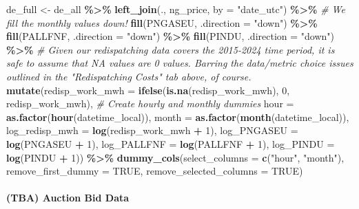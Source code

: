 \documentclass[
]{article}
\newenvironment{Shaded}{\begin{snugshade}}{\end{snugshade}}
\newcommand{\AttributeTok}[1]{\textcolor[rgb]{0.13,0.29,0.53}{#1}}
\newcommand{\CommentTok}[1]{\textcolor[rgb]{0.56,0.35,0.01}{\textit{#1}}}
\newcommand{\ConstantTok}[1]{\textcolor[rgb]{0.56,0.35,0.01}{#1}}
\newcommand{\DecValTok}[1]{\textcolor[rgb]{0.00,0.00,0.81}{#1}}
\newcommand{\FunctionTok}[1]{\textcolor[rgb]{0.13,0.29,0.53}{\textbf{#1}}}
\newcommand{\NormalTok}[1]{#1}
\newcommand{\OtherTok}[1]{\textcolor[rgb]{0.56,0.35,0.01}{#1}}
\newcommand{\SpecialCharTok}[1]{\textcolor[rgb]{0.81,0.36,0.00}{\textbf{#1}}}
\newcommand{\StringTok}[1]{\textcolor[rgb]{0.31,0.60,0.02}{#1}}
\begin{document}
\begin{Shaded}
\begin{Highlighting}[]
\NormalTok{de\_full }\OtherTok{\textless{}{-}}\NormalTok{ de\_all }\SpecialCharTok{\%\textgreater{}\%} 
  \FunctionTok{left\_join}\NormalTok{(., ng\_price, }\AttributeTok{by =} \StringTok{"date\_utc"}\NormalTok{) }\SpecialCharTok{\%\textgreater{}\%} 
  \CommentTok{\# We fill the monthly values down! }
  \FunctionTok{fill}\NormalTok{(PNGASEU, }\AttributeTok{.direction =} \StringTok{"down"}\NormalTok{) }\SpecialCharTok{\%\textgreater{}\%} 
  \FunctionTok{fill}\NormalTok{(PALLFNF, }\AttributeTok{.direction =} \StringTok{"down"}\NormalTok{) }\SpecialCharTok{\%\textgreater{}\%} 
  \FunctionTok{fill}\NormalTok{(PINDU, }\AttributeTok{.direction =} \StringTok{"down"}\NormalTok{) }\SpecialCharTok{\%\textgreater{}\%} 
  \CommentTok{\# Given our redispatching data covers the 2015{-}2024 time period, it is safe to assume that NA values are 0 values. Barring the data/metric choice issues outlined in the "Redispatching Costs" tab above, of course.}
  \FunctionTok{mutate}\NormalTok{(}\AttributeTok{redisp\_work\_mwh =} \FunctionTok{ifelse}\NormalTok{(}\FunctionTok{is.na}\NormalTok{(redisp\_work\_mwh), }\DecValTok{0}\NormalTok{, redisp\_work\_mwh),}
         \CommentTok{\# Create hourly and monthly dummies}
        \AttributeTok{hour =} \FunctionTok{as.factor}\NormalTok{(}\FunctionTok{hour}\NormalTok{(datetime\_local)),}
         \AttributeTok{month =} \FunctionTok{as.factor}\NormalTok{(}\FunctionTok{month}\NormalTok{(datetime\_local)),}
        \AttributeTok{log\_redisp\_mwh =} \FunctionTok{log}\NormalTok{(redisp\_work\_mwh }\SpecialCharTok{+} \DecValTok{1}\NormalTok{),}
        \AttributeTok{log\_PNGASEU =} \FunctionTok{log}\NormalTok{(PNGASEU }\SpecialCharTok{+} \DecValTok{1}\NormalTok{),}
        \AttributeTok{log\_PALLFNF =} \FunctionTok{log}\NormalTok{(PALLFNF }\SpecialCharTok{+} \DecValTok{1}\NormalTok{),}
        \AttributeTok{log\_PINDU =} \FunctionTok{log}\NormalTok{(PINDU }\SpecialCharTok{+} \DecValTok{1}\NormalTok{)) }\SpecialCharTok{\%\textgreater{}\%} 
  \FunctionTok{dummy\_cols}\NormalTok{(}\AttributeTok{select\_columns =} \FunctionTok{c}\NormalTok{(}\StringTok{"hour"}\NormalTok{, }\StringTok{"month"}\NormalTok{), }\AttributeTok{remove\_first\_dummy =} \ConstantTok{TRUE}\NormalTok{, }\AttributeTok{remove\_selected\_columns =} \ConstantTok{TRUE}\NormalTok{)}
\end{Highlighting}
\end{Shaded}

\paragraph{(TBA) Auction Bid Data}\label{tba-auction-bid-data}
\end{document}
